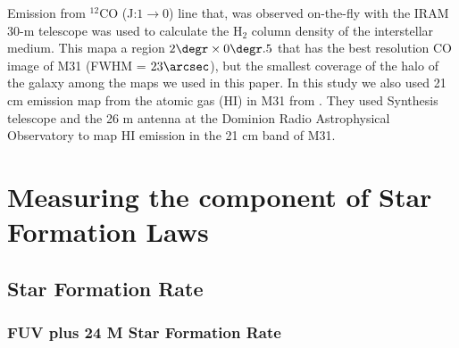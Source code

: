 \documentclass[useAMS,usenatbib]{mn2e}
\begin{document}
Emission from $^{12}$CO (J:$1\rightarrow0$) line that, was observed on-the-fly with the IRAM 30-m telescope \citep{Nieten06} was used to calculate the H$_2$ column density of the interstellar medium. This mapa a region $2\degr \times 0\degr.5$ that has the best resolution CO image of M31 (FWHM = $23\arcsec$), but the smallest coverage of the halo of the galaxy among the maps we used in this paper. In this study we also used 21 cm emission map from the atomic gas (HI) in M31 from \cite{Chemin09}. They used Synthesis telescope and the 26 m antenna at the Dominion Radio Astrophysical Observatory to map HI emission in the 21 cm band of M31.

\section{Measuring the component of Star Formation Laws}

\subsection{Star Formation Rate}
\label{sec:sfr}
\subsubsection{FUV plus 24 M Star Formation Rate}
\end{document}
